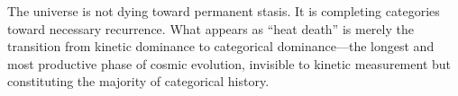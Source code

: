 The universe is not dying toward permanent stasis. It is completing categories toward necessary recurrence. What appears as ``heat death'' is merely the transition from kinetic dominance to categorical dominance---the longest and most productive phase of cosmic evolution, invisible to kinetic measurement but constituting the majority of categorical history.

